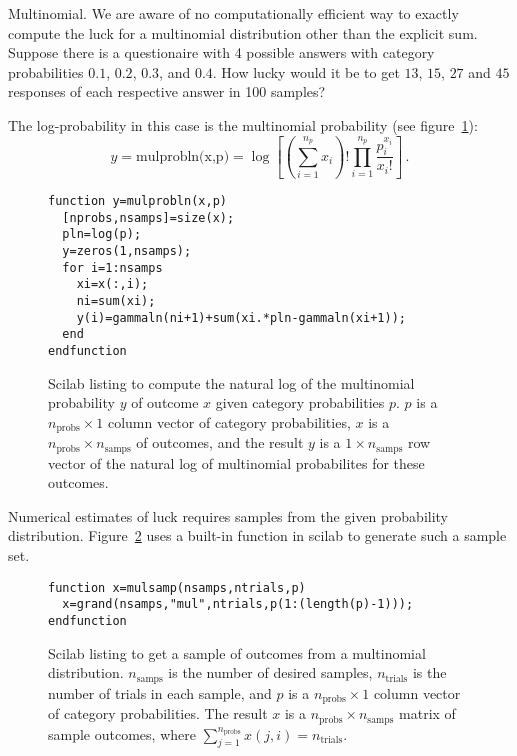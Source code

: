 \begin{example}{Multinomial.} We are aware of no computationally efficient way to exactly compute the luck for a multinomial distribution other than the explicit sum.  Suppose there is a questionaire with 4 possible answers with category probabilities $0.1$, $0.2$, $0.3$, and $0.4$.  How lucky would it be to get $13$, $15$, $27$ and $45$ responses of each respective answer in 100 samples? 


The log-probability in this case is the multinomial probability (see figure~\ref{fig:mulprobln}):
\begin{equation}
y=\text{mulprobln(x,p)}=\log \left[\left(\sum_{i=1}^{n_p} x_i \right)! \prod_{i=1}^{n_p} \frac{p_i^{x_i}}{x_i!} \right]\,.
\end{equation}

\begin{figure}
\caption{\label{fig:mulprobln}Scilab listing to compute the natural log of the multinomial probability $y$ of outcome $x$ given category probabilities $p$.  $p$ is a $n_{\text{probs}} \times 1$ column vector of category probabilities, $x$ is a $n_{\text{probs}} \times n_{\text{samps}}$ of outcomes, and the result $y$ is a $1 \times n_{\text{samps}}$ row vector of the natural log of multinomial probabilites for these outcomes.}
\lstset{language=Scilab}
\begin{lstlisting}
function y=mulprobln(x,p)
  [nprobs,nsamps]=size(x);
  pln=log(p);
  y=zeros(1,nsamps);
  for i=1:nsamps
    xi=x(:,i);
    ni=sum(xi);
    y(i)=gammaln(ni+1)+sum(xi.*pln-gammaln(xi+1));
  end
endfunction
\end{lstlisting}
\end{figure}

Numerical estimates of luck requires samples from the given probability distribution.  Figure~\ref{fig:mulsamps} uses a built-in function in scilab to generate such a sample set.
\begin{figure}
\caption{\label{fig:mulsamps}Scilab listing to get a sample of outcomes from a multinomial distribution.  $n_{\text{samps}}$ is the number of desired samples, $n_{\text{trials}}$ is the number of trials in each sample, and $p$ is a $n_{\text{probs}} \times 1$ column vector of category probabilities.  The result $x$ is a $n_{\text{probs}} \times n_{\text{samps}}$ matrix of sample outcomes, where $\sum_{j=1}^{n_{\text{probs}}} x(j,i)=n_{\text{trials}}$.}
\lstset{language=Scilab}
\begin{lstlisting}
function x=mulsamp(nsamps,ntrials,p)
  x=grand(nsamps,"mul",ntrials,p(1:(length(p)-1)));
endfunction
\end{lstlisting}
\end{figure}


\end{example}
